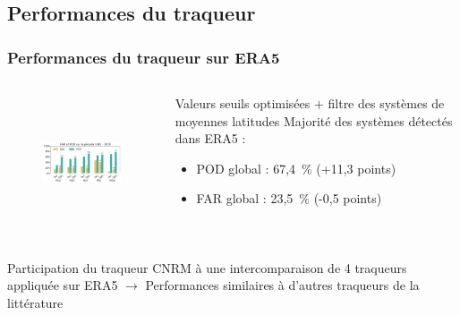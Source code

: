 \documentclass[aspectratio=169, usepdftitle=false, xcolor={dvipsnames}, 9pt,table]{beamer}
\begin{document}
\subsection*{Performances du traqueur}
\begin{frame}[t]
    \frametitle{Performances du traqueur sur ERA5}
    \footnotesize
    \begin{columns}
        \begin{column}{0.56\textwidth}
        \footnotesize
        \begin{figure}
            \centering
            \includegraphics[height=4cm]{Figures/far_pod_avant_apres.png}
        \end{figure}
        \end{column}
        \begin{column}{0.4\linewidth}
        \footnotesize
        \vspace{-1em}
        \begin{block}        
            Valeurs seuils \alert{optimisées} + filtre des systèmes de moyennes latitudes \parencite{hart_cyclone_2003}
            \tcblower
            \setlength{\leftmargini}{2.5ex}
            \alert{Majorité} des systèmes détectés dans ERA5 :
            \begin{itemize}
                \item POD global : 67,4~\% (+11,3 points)
                \item FAR global : 23,5~\% (-0,5 points)
            \end{itemize}
        \end{block}
        \end{column}
    \end{columns}
    \vspace{1em}
    \begin{examples}    
        Participation du traqueur CNRM à une \alert{intercomparaison} de 4 traqueurs appliquée sur ERA5 \parencite{bourdin_intercomparison_2022}
        \tcblower
        $\longrightarrow$ Performances similaires à d'autres traqueurs de la littérature
    \end{examples}
\end{frame}
\end{document}

